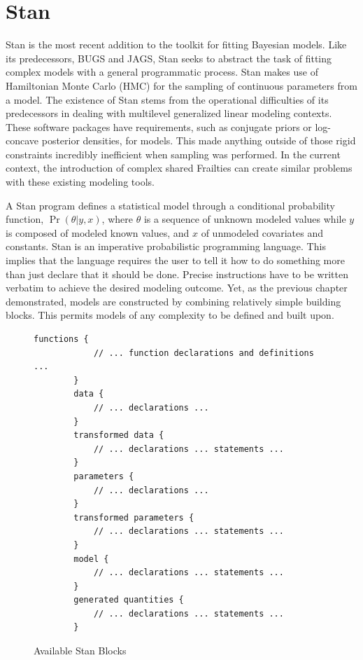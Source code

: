 \newpage
\section*{Stan}


Stan is the most recent addition to the toolkit for fitting Bayesian models. Like its predecessors, BUGS and JAGS, Stan seeks to abstract the task of fitting complex models with a general programmatic process. Stan makes use of Hamiltonian Monte Carlo (HMC) for the sampling of continuous parameters from a model. The existence of Stan stems from the operational difficulties of its predecessors in dealing with multilevel generalized linear modeling contexts. These software packages have requirements, such as conjugate priors or log-concave posterior densities, for models. This made anything outside of those rigid constraints incredibly inefficient when sampling was performed. In the current context, the introduction of complex shared Frailties can create similar problems with these existing modeling tools. 

A Stan program defines a statistical model through a conditional probability function, $\Pr(\theta|y,x)$, where $\theta$ is a sequence of unknown modeled values while $y$ is composed of modeled known values, and $x$ of unmodeled covariates and constants\cite{StanDevelopmentTeam2016}. Stan is an imperative probabilistic programming language. This implies that the language requires the user to tell it how to do something more than just declare that it should be done. Precise instructions have to be written verbatim to achieve the desired modeling outcome. Yet, as the previous chapter demonstrated, models are constructed by combining relatively simple building blocks. This permits models of any complexity to be defined and built upon.


\begin{figure}[htbp]
    \centering
    \begin{lstlisting}[belowskip=-2 \baselineskip]
        functions {
        	// ... function declarations and definitions ...
        }
        data {
        	// ... declarations ...
        }
        transformed data {
        	// ... declarations ... statements ...
        }
        parameters {
        	// ... declarations ...
        }
        transformed parameters {
        	// ... declarations ... statements ...
        }
        model {
        	// ... declarations ... statements ...
        }
        generated quantities {
        	// ... declarations ... statements ...
        }\end{lstlisting}
    \caption{Available Stan Blocks}
    \label{stanblocks}
\end{figure}


